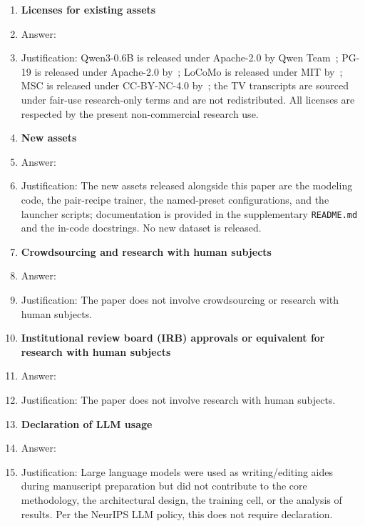 \begin{enumerate}
\item {\bf Licenses for existing assets}
    \item[] Answer: \answerYes{}
    \item[] Justification: Qwen3-0.6B is released under Apache-2.0 by Qwen Team~\cite{qwen3}; PG-19 is released under Apache-2.0 by~\cite{rae2019compressive}; LoCoMo is released under MIT by~\cite{maharana2024locomo}; MSC is released under CC-BY-NC-4.0 by~\cite{xu2022msc}; the TV transcripts are sourced under fair-use research-only terms and are not redistributed.  All licenses are respected by the present non-commercial research use.

\item {\bf New assets}
    \item[] Answer: \answerYes{}
    \item[] Justification: The new assets released alongside this paper are the modeling code, the pair-recipe trainer, the named-preset configurations, and the launcher scripts; documentation is provided in the supplementary \texttt{README.md} and the in-code docstrings.  No new dataset is released.

\item {\bf Crowdsourcing and research with human subjects}
    \item[] Answer: \answerNA{}
    \item[] Justification: The paper does not involve crowdsourcing or research with human subjects.

\item {\bf Institutional review board (IRB) approvals or equivalent for research with human subjects}
    \item[] Answer: \answerNA{}
    \item[] Justification: The paper does not involve research with human subjects.

\item {\bf Declaration of LLM usage}
    \item[] Answer: \answerNA{}
    \item[] Justification: Large language models were used as writing/editing aides during manuscript preparation but did not contribute to the core methodology, the architectural design, the training cell, or the analysis of results.  Per the NeurIPS LLM policy, this does not require declaration.

\end{enumerate}

